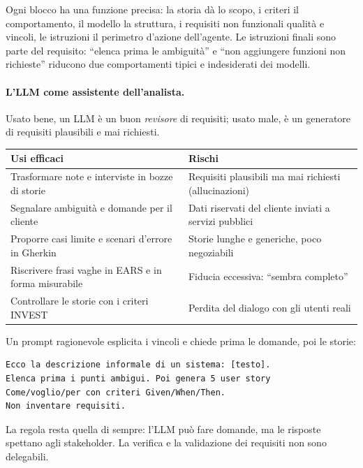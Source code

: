 \documentclass[12pt]{extarticle}
\begin{document}
\noindent Ogni blocco ha una funzione precisa: la storia dà lo scopo, i criteri il comportamento, il modello la struttura, i requisiti non funzionali qualità e vincoli, le istruzioni il perimetro d'azione dell'agente. Le istruzioni finali sono parte del requisito: ``elenca prima le ambiguità'' e ``non aggiungere funzioni non richieste'' riducono due comportamenti tipici e indesiderati dei modelli.

\paragraph{L'LLM come assistente dell'analista.}
Usato bene, un LLM è un buon \textit{revisore} di requisiti; usato male, è un generatore di requisiti plausibili e mai richiesti.

\begin{center}
\small
\begin{tabular}{p{7.6cm}p{7.6cm}}
    \toprule
    \textbf{Usi efficaci} & \textbf{Rischi} \\
    \midrule
    Trasformare note e interviste in bozze di storie & Requisiti plausibili ma mai richiesti (allucinazioni) \\
    \addlinespace
    Segnalare ambiguità e domande per il cliente & Dati riservati del cliente inviati a servizi pubblici \\
    \addlinespace
    Proporre casi limite e scenari d'errore in Gherkin & Storie lunghe e generiche, poco negoziabili \\
    \addlinespace
    Riscrivere frasi vaghe in EARS e in forma misurabile & Fiducia eccessiva: ``sembra completo'' \\
    \addlinespace
    Controllare le storie con i criteri INVEST & Perdita del dialogo con gli utenti reali \\
    \bottomrule
\end{tabular}
\end{center}

\noindent Un prompt ragionevole esplicita i vincoli e chiede prima le domande, poi le storie:

\begin{lstlisting}
Ecco la descrizione informale di un sistema: [testo].
Elenca prima i punti ambigui. Poi genera 5 user story
Come/voglio/per con criteri Given/When/Then.
Non inventare requisiti.
\end{lstlisting}

\noindent La regola resta quella di sempre: l'LLM può fare domande, ma le risposte spettano agli stakeholder. La verifica e la validazione dei requisiti non sono delegabili.
\end{document}
